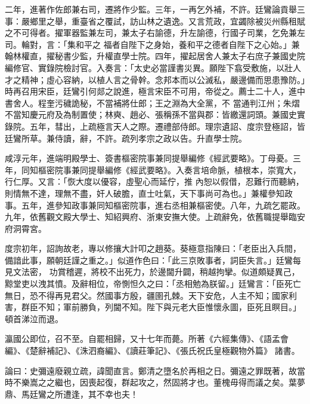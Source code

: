 \begin{pinyinscope}
 二年，進著作佐郎兼右司，遷將作少監。三年，一再乞外補，不許。廷鸞論貢舉三事：嚴鄉里之舉，重臺省之覆試，訪山林之遺逸。又言荒政，宜蠲除被災州縣租賦之不可得者。擢軍器監兼左司，兼太子右諭德，升左諭德，行國子司業，乞免兼左司。輪對，言：「集和平之
 福者自陛下之身始，養和平之德者自陛下之心始。」兼翰林權直，擢秘書少監，升權直學士院。四年，擢起居舍人兼太子右庶子兼國史院編修官、實錄院檢討官。入奏言：「太史必當謹書災異。願陛下翕受敷施，以壯人才之精神；虛心容納，以植人言之骨幹。念邦本而以公滅私，嚴邊備而思患豫防。」時再召用宋臣，廷鸞引何郯之說進，極言宋臣不可用，帝從之。薦士二十人，進中書舍人。程奎污穢詭秘，不當補將仕郎；王之淵為大全黨，不
 當通判江州；朱熠不當知慶元府及為制置使；林奭、趙必、張稱孫不當與郡：皆繳還詞頭。兼國史實錄院。五年，彗出，上疏極言天人之際。遷禮部侍郎。理宗遺詔、度宗登極詔，皆廷鸞所草。兼侍讀，辭，不許。疏列孝宗之政以告。升直學士院。



 咸淳元年，進端明殿學士、簽書樞密院事兼同提舉編修《經武要略》。丁母憂。三年，同知樞密院事兼同提舉編修《經武要略》。入奏言培命脈，植根本，崇寬大，行仁厚。又言：「恢大度以優容，虛聖心而延佇，推
 內恕以假借，忍難行而聽納，則情無不達，理無不盡，奸人破膽，直士吐氣，天下事尚可為也。」兼權參知政事。五年，進參知政事兼同知樞密院事，進右丞相兼樞密使。八年，九疏乞罷政。九年，依舊觀文殿大學士、知紹興府、浙東安撫大使。上疏辭免，依舊職提舉臨安府洞霄宮。



 度宗初年，詔詢故老，專以修攘大計叩之趙葵。葵極意指陳曰：「老臣出入兵間，備諳此事，願朝廷謹之重之。」似道作色曰：「此三京敗事者，詞臣失言。」廷鸞每見文法密，
 功賞稽遲，將校不出死力，於邊閫升闢，稍越拘攣。似道頗疑異己，黥堂吏以洩其憤。及辭相位，帝惻怛久之曰：「丞相勉為朕留。」廷鸞言：「臣死亡無日，恐不得再見君父。然國事方殷，疆圉孔棘。天下安危，人主不知；國家利害，群臣不知；軍前勝負，列閫不知。陛下與元老大臣惟懷永圖，臣死且瞑目。」頓首涕泣而退。



 瀛國公即位，召不至。自罷相歸，又十七年而薨。所著《六經集傳》、《語孟會編》、《楚辭補記》、《洙泗裔編》、《讀莊筆記》、《張氏祝氏皇極觀物外篇》
 諸書。



 論曰：史彌遠廢親立疏，諱聞直言。鄭清之墮名於再相之日。彌遠之罪既著，故當時不樂嵩之之繼也，因喪起復，群起攻之，然固將才也。董槐毋得而議之矣。葉夢鼎、馬廷鸞之所遭逢，其不幸也夫！



\end{pinyinscope}